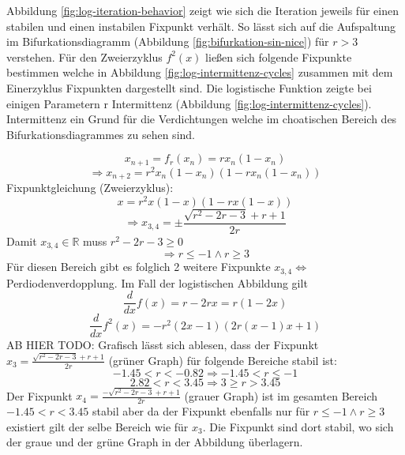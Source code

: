 \documentclass{scrartcl}
\begin{document}
Abbildung \ref{fig:log-iteration-behavior} zeigt wie sich die Iteration jeweils für einen stabilen und einen instabilen Fixpunkt verhält. So lässt sich auf die Aufspaltung im Bifurkationsdiagramm (Abbildung \ref{fig:bifurkation-sin-nice}) für $r>3$ verstehen.  
Für den Zweierzyklus $f^2(x)$ ließen sich folgende Fixpunkte bestimmen welche in Abbildung \ref{fig:log-intermittenz-cycles} zusammen mit dem Einerzyklus Fixpunkten dargestellt sind. 
Die logistische Funktion zeigte bei einigen Parametern r Intermittenz (Abbildung \ref{fig:log-intermittenz-cycles}). Intermittenz ein Grund für die Verdichtungen welche im choatischen Bereich des Bifurkationsdiagrammes zu sehen sind.

$$x_{n+1}=f_r(x_n)=rx_n(1-x_n)$$
$$\Rightarrow x_{n+2}=r^2x_n(1-x_n)(1-rx_n(1-x_n))$$
\newline
Fixpunktgleichung (Zweierzyklus):
$$x=r^2x(1-x)(1-rx(1-x))$$
$$\Rightarrow x_{3,4}=\pm\frac{\sqrt{r^2-2 r-3}+r+1}{2 r}$$
Damit $x_{3,4} \in \mathbb{R} $  muss $r^2-2 r-3 \geq 0$
$$\Rightarrow r \leq -1 \land r \geq 3$$
Für diesen Bereich gibt es folglich 2 weitere Fixpunkte $x_{3,4} 
\Leftrightarrow$ Perdiodenverdopplung. 
Im Fall der logistischen Abbildung gilt
$$\frac{d}{dx}f(x)=r-2rx=r(1-2x)$$
$$\frac{d}{dx}f^2(x)=-r^2(2x-1)(2r(x-1)x+1)$$
AB HIER TODO: Grafisch lässt sich ablesen, dass der Fixpunkt $x_3=\frac{\sqrt{r^2-2 r-3}+r+1}{2 r}$ (grüner Graph) für folgende Bereiche stabil ist:
$$-1.45<r<-0.82 \Rightarrow -1.45 < r \leq -1$$
$$2.82<r<3.45 \Rightarrow 3 \geq r > 3.45$$
Der Fixpunkt $x_4=\frac{-\sqrt{r^2-2 r-3}+r+1}{2 r}$ (grauer Graph) ist im gesamten Bereich $-1.45<r<3.45$ stabil aber da der Fixpunkt ebenfalls nur für $r \leq -1 \land r \geq 3$ existiert gilt der selbe Bereich wie für $x_3$. Die Fixpunkt sind dort stabil, wo sich der graue und der grüne Graph in der Abbildung überlagern.
\end{document}
